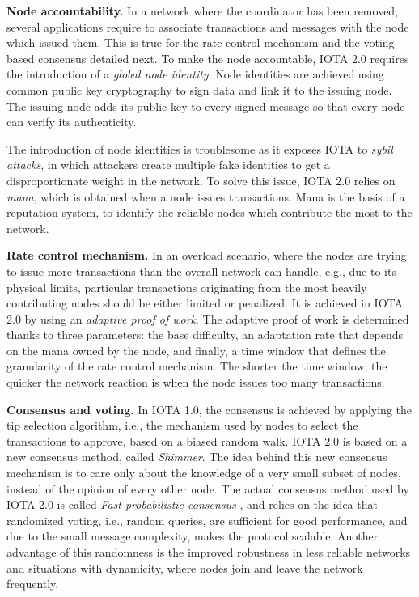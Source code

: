   \textbf{Node accountability.} In a network where the coordinator has been removed, several applications require to
  associate transactions and messages with the node which issued them. This is true for the rate control mechanism and the 
  voting-based consensus detailed next. To make the node accountable, IOTA 2.0 requires the introduction of a \emph{global node identity}.
 Node identities are achieved using common public key cryptography to sign data and link it to the issuing node.
  The issuing node adds its public key to every signed message so that every node can verify its authenticity.

  The introduction of node identities is troublesome as it exposes IOTA to \emph{sybil attacks}, in which
  attackers create multiple fake identities to get a disproportionate weight in the network. To solve this issue, 
  IOTA 2.0 relies on \emph{mana}, which is obtained when a node issues transactions. Mana is the basis of a 
  reputation system, to identify the reliable nodes which contribute the most to the network.

  \textbf{Rate control mechanism.} In an overload scenario, where the nodes 
  are trying to issue more transactions than the overall network can handle, e.g., due to its
  physical limits, particular transactions originating from the most heavily
  contributing nodes should be either limited or penalized. It is achieved in IOTA 2.0 
  by using an \emph{adaptive proof of work}. The adaptive proof of work is determined thanks to 
  three parameters: the base difficulty, an adaptation rate that depends on the mana owned by the node, 
  and finally, a time window that defines the granularity of the rate control mechanism. The shorter the time window, 
  the quicker the network reaction is when the node issues too many transactions.

  \textbf{Consensus and voting.} In IOTA 1.0, the consensus is achieved 
  by applying the tip selection algorithm, i.e., the mechanism used by
  nodes to select the transactions to approve, based on a biased random walk.
  IOTA 2.0 is based on a new consensus method, called \emph{Shimmer}.
  The idea behind this new consensus mechanism is to care only about the knowledge of a very small subset of
  nodes, instead of the opinion of every other node. The actual consensus method used by IOTA 2.0 is called 
  \emph{Fast probabilistic consensus} \cite{Cooper2015, MallmannTrenn2017}, and relies on the idea
  that randomized voting, i.e., random queries, are sufficient for
  good performance, and due to the small message complexity, makes the protocol scalable.
  Another advantage of this randomness is the improved robustness in less reliable networks and situations 
  with dynamicity, where nodes join and leave the network frequently.

